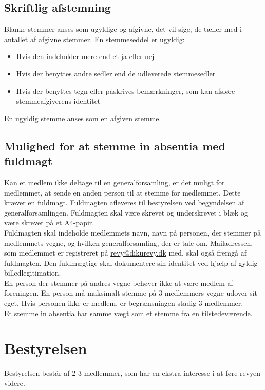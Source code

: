 \documentclass[a4paper,11pt,danish]{article}
\begin{document}
\subsection{Skriftlig afstemning}
Blanke stemmer anses som ugyldige og afgivne, det vil sige, de tæller med i
antallet af afgivne stemmer.  En stemmeseddel er ugyldig:

\begin{itemize}
\item Hvis den indeholder mere end et ja eller nej
\item Hvis der benyttes andre sedler end de udleverede stemmesedler
\item Hvis der benyttes tegn eller påskrives bemærkninger, som kan afsløre
stemmeafgiverens identitet
\end{itemize}

\noindent En ugyldig stemme anses som en afgiven stemme.

\subsection{Mulighed for at stemme in absentia med fuldmagt}
Kan et medlem ikke deltage til en generalforsamling, er det muligt for 
medlemmet, at sende en anden person til at stemme for medlemmet. Dette kræver en
fuldmagt. Fuldmagten afleveres til bestyrelsen ved begyndelsen af
generalforsamlingen. Fuldmagten skal være skrevet og underskrevet i blæk og være
skrevet på et A4-papir.\\

\noindent Fuldmagten skal indeholde medlemmets navn, navn på personen, der
stemmer på medlemmets vegne, og hvilken generalforsamling, der er tale om.
Mailadressen, som medlemmet er registreret på \url{revy@dikurevy.dk} med, skal
også fremgå af fuldmagten. Den fuldmægtige skal dokumentere sin identitet ved
hjælp af gyldig billedlegitimation.\\

\noindent En person der stemmer på andres vegne behøver ikke at være medlem af
foreningen. En person må maksimalt stemme på 3 medlemmers vegne udover sit eget.
Hvis personen ikke er medlem, er begrænsningen stadig 3 medlemmer.\\

\noindent Et stemme in absentia har samme vægt som et stemme fra en
tilstedeværende.

\section{Bestyrelsen}
Bestyrelsen består af 2-3 medlemmer, som har en ekstra interesse i at føre
revyen videre.\\
\end{document}
